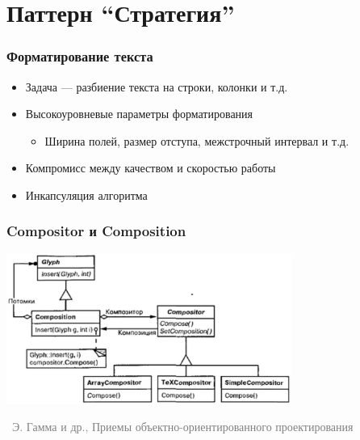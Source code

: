 \documentclass[xetex,mathserif,serif]{beamer}
\newcommand{\attribution}[1] {
    \vspace{-5mm}\begin{flushright}\begin{scriptsize}\textcolor{gray}{\textcopyright\, #1}\end{scriptsize}\end{flushright}
}
\begin{document}
    \section{Паттерн ``Стратегия''}

    \begin{frame}
        \frametitle{Форматирование текста}
        \begin{itemize}
            \item Задача --- разбиение текста на строки, колонки и т.д.
            \item Высокоуровневые параметры форматирования
            \begin{itemize}
                \item Ширина полей, размер отступа, межстрочный интервал и т.д.
            \end{itemize}
            \item Компромисс между качеством и скоростью работы
            \item Инкапсуляция алгоритма
        \end{itemize}
    \end{frame}

    \begin{frame}
        \frametitle{Compositor и Composition}
        \begin{center}
            \includegraphics[width=0.7\textwidth]{compositor.png}
            \attribution{Э. Гамма и др., Приемы объектно-ориентированного проектирования}
        \end{center}
    \end{frame}
\end{document}
